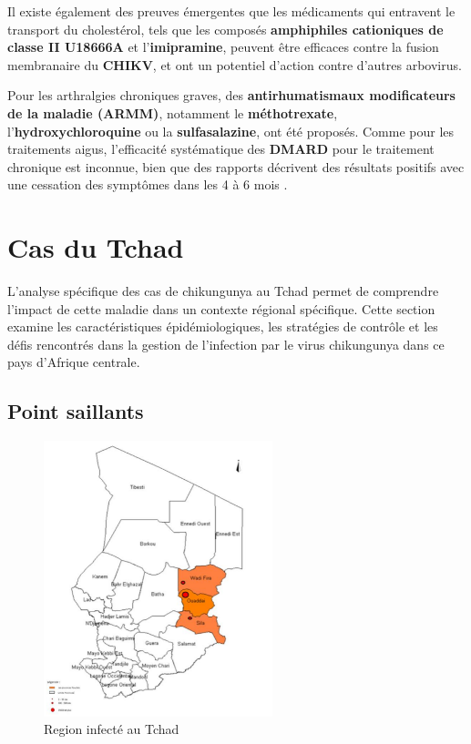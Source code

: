 Il existe également des preuves émergentes que les médicaments qui entravent le transport du cholestérol, tels que les composés \textbf{amphiphiles cationiques de classe II U18666A} et l'\textbf{imipramine}, peuvent être efficaces contre la fusion membranaire du \textbf{CHIKV}, et ont un potentiel d'action contre d'autres arbovirus.

Pour les arthralgies chroniques graves, des \textbf{antirhumatismaux modificateurs de la maladie (ARMM)}, notamment le \textbf{méthotrexate}, l'\textbf{hydroxychloroquine} ou la \textbf{sulfasalazine}, ont été proposés. Comme pour les traitements aigus, l'efficacité systématique des \textbf{DMARD} pour le traitement chronique est inconnue, bien que des rapports décrivent des résultats positifs avec une cessation des symptômes dans les 4 à 6 mois \cite{ganesan2017chikungunya}.

\section{Cas du Tchad}

L'analyse spécifique des cas de chikungunya au Tchad permet de comprendre l'impact de cette maladie dans un contexte régional spécifique. Cette section examine les caractéristiques épidémiologiques, les stratégies de contrôle et les défis rencontrés dans la gestion de l'infection par le virus chikungunya dans ce pays d'Afrique centrale.

\subsection{Point saillants}
\begin{figure}[!h]
	\begin{center}
		\includegraphics[height=8cm]{images/chadmap}
	\end{center}
	\caption{Region infecté au Tchad}
	\label{fig:chikvintchadmap}
\end{figure}

